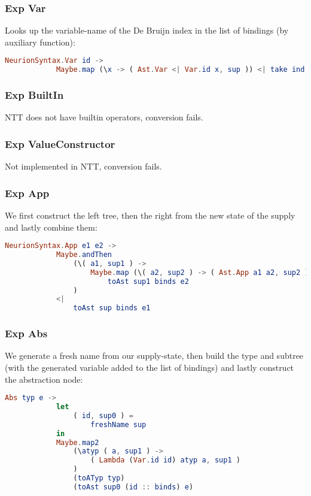 \documentclass[10pt,a4paper,english]{article}
\begin{document}
\subsubsection*{Exp Var}
Looks up the variable-name of the De Bruijn index in the list of bindings (by auxiliary function):
\begin{lstlisting}[language=elm,%
                     label="eval-evaluated",%
                     gobble=8,%
                     ]
        NeurionSyntax.Var id ->
            Maybe.map (\x -> ( Ast.Var <| Var.id x, sup )) <| take ind binds
\end{lstlisting}

\subsubsection*{Exp BuiltIn}
NTT does not have builtin operators, conversion fails.

\subsubsection*{Exp ValueConstructor}
Not implemented in NTT, conversion fails.

\subsubsection*{Exp App}
We first construct the left tree, then the right from the new state of the supply and lastly combine them:
\begin{lstlisting}[language=elm,%
                     label="eval-evaluated",%
                     gobble=8,%
                     ]
        NeurionSyntax.App e1 e2 ->
            Maybe.andThen
                (\( a1, sup1 ) ->
                    Maybe.map (\( a2, sup2 ) -> ( Ast.App a1 a2, sup2 )) <|
                        toAst sup1 binds e2
                )
            <|
                toAst sup binds e1
\end{lstlisting}

\subsubsection*{Exp Abs}
We generate a fresh name from our supply-state, then build the type and subtree (with the generated variable added to the list of bindings) and lastly construct the abstraction node:
\begin{lstlisting}[language=elm,%
                     label="eval-evaluated",%
                     gobble=8,%
                     ]
        Abs typ e ->
            let
                ( id, sup0 ) =
                    freshName sup
            in
            Maybe.map2
                (\atyp ( a, sup1 ) ->
                    ( Lambda (Var.id id) atyp a, sup1 )
                )
                (toATyp typ)
                (toAst sup0 (id :: binds) e)
\end{lstlisting}
\end{document}
